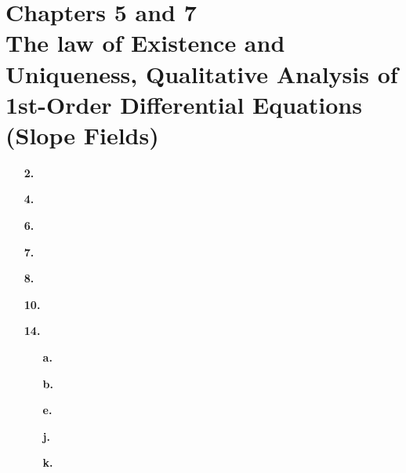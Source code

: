 
\section{Chapters 5 and 7\\{\large The law of Existence and Uniqueness, Qualitative Analysis of 1st-Order Differential Equations (Slope Fields)}}

\begin{enumerate}
	\setlength{\itemsep}{\bigskipamount}
	\item[\textbf{2.}]


	\item[\textbf{4.}]


	\item[\textbf{6.}]


	\item[\textbf{7.}]


	\item[\textbf{8.}]


	\item[\textbf{10.}]


	\item[\textbf{14.}]
		\begin{enumerate}
			\item[\textbf{a.}]


			\item[\textbf{b.}]


			\item[\textbf{e.}]


			\item[\textbf{j.}]


			\item[\textbf{k.}]


		\end{enumerate}
\end{enumerate}